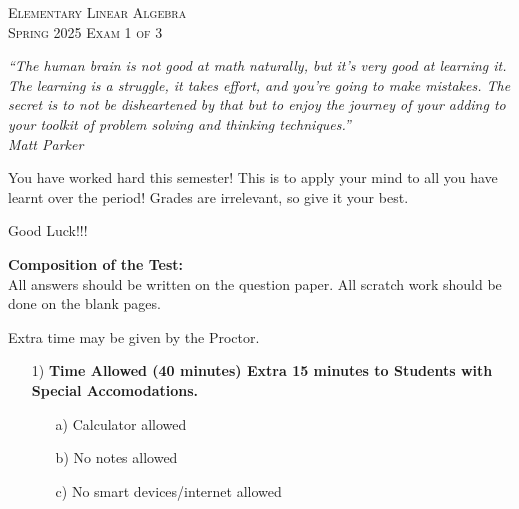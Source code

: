 \documentclass[12pt]{article}%
\begin{document}
\newcommand{\HRule}{\rule{\linewidth}{0.5mm}}

\begin{minipage}{0.8\textwidth}
\begin{flushright}
\centering
\textsc{\small Elementary Linear Algebra}\\[0.1cm] 
\textsc{\small Spring 2025 Exam 1 of 3
}\\[0.1cm] 
\end{flushright}
\end{minipage}

\vspace{1cm}
\begin{center}
    \textit{“The human brain is not good at math naturally, but it’s very good at learning it. The learning is a struggle, it takes effort, and you're going to make mistakes. The secret is to not be disheartened by that but to enjoy the journey of your adding to your toolkit of problem solving and thinking techniques.”}
\\
\textit{Matt Parker}

\end{center}


You have worked hard this semester! This is to apply your mind to all you have learnt over the period! Grades are irrelevant, so give it your best.
\begin{center}
    Good Luck!!!
\end{center}

\textbf{Composition of the Test:}\\
All answers should be written on the question paper. All scratch work should be done on the blank pages.

Extra time may be given by the Proctor.

\begin{enumerate}
    \item[1)] \textbf{Time Allowed (40 minutes) Extra 15 minutes to Students with Special Accomodations.}
    \begin{itemize}
        \item[a)] Calculator allowed

        \item[b)] No notes allowed
        
        \item[c)] No smart devices/internet allowed
    \end{itemize}
    
\end{enumerate}
\end{document}
